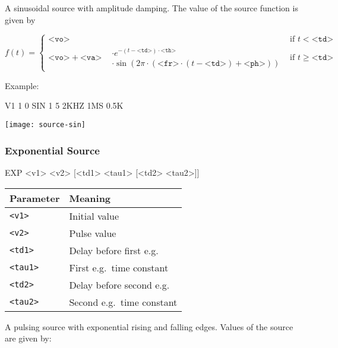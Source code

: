 A sinusoidal source with amplitude damping. The value of the source function is given by

\[f(t) = \begin{cases}

\texttt{<vo> } & \text{if } t < \texttt{<td>} \\
\texttt{<vo>} + \texttt{<va>} \begin{aligned}
&\cdot e^{- (t - \texttt{<td>}) \cdot \texttt{<th>}}\\
&\cdot \sin{(2 \pi \cdot  (\texttt{<fr>} \cdot (t - \texttt{<td>}) + \texttt{<ph>}))}
\end{aligned}  & \text{if } t \ge \texttt{<td>}
\end{cases}\] 


Example:

\begin{code}
V1 1 0 SIN 1 5 2KHZ 1MS 0.5K
\end{code}

\begin{center}
	\texttt{[image: source-sin]}
\end{center}

\pagebreak
\subsubsection{Exponential Source}

\begin{code}
EXP <v1> <v2> [<td1> <tau1> [<td2> <tau2>]]
\end{code}

\begin{center}
	\begin{tabular}{|l|l|}
		\hline
		Parameter & Meaning \\ \hline \hline
		\texttt{<v1>} & Initial value \\ \hline
		\texttt{<v2>} & Pulse value \\ \hline
		\texttt{<td1>} & Delay before first e.g.\ \\ \hline
		\texttt{<tau1>} & First e.g.\ time constant \\ \hline
		\texttt{<td2>} & Delay before second e.g.\ \\ \hline
		\texttt{<tau2>} & Second e.g.\ time constant \\ \hline
	\end{tabular}
\end{center}

A pulsing source with exponential rising and falling edges. Values of the source are given by:

